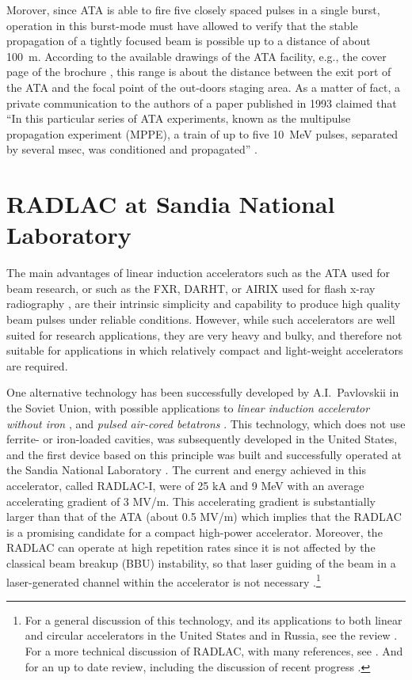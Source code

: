 \documentclass [12pt,a4paper,     ]{report} %
\begin{document}
   Morover, since ATA is able to fire five closely spaced pulses in a single burst, operation in this burst-mode must have allowed to verify that the stable propagation of a tightly focused beam is possible up to a distance of about 100~m.  According to the available drawings of the ATA facility, e.g., the cover page of the brochure \cite{LLNL1978-}, this range is about the distance between the exit port of the ATA and the focal point of the out-doors staging area.  As a matter of fact, a private communication to the authors of a paper published in 1993 claimed that ``In this particular series of ATA experiments, known as the multipulse propagation experiment (MPPE), a train of up to five 10~MeV pulses, separated by several msec, was conditioned and propagated'' \cite[p.4184]{HUBBA1993-}.



\section{RADLAC at Sandia National Laboratory}
\label{snl:0}


The main advantages of linear induction accelerators such as the ATA used for beam research, or such as the FXR, DARHT, or AIRIX used for flash x-ray radiography \cite{YU---1996-}, are their intrinsic simplicity and capability to produce high quality beam pulses under reliable conditions.  However, while such accelerators are well suited for research applications, they are very heavy and bulky, and therefore not suitable for applications in which relatively compact and light-weight accelerators are required.

One alternative technology has been successfully developed by A.I.\ Pavlovskii in the Soviet Union,  with possible applications to \emph{linear induction accelerator without iron} \cite{PAVLO1974-, PAVLO1980-}, and \emph{pulsed air-cored betatrons} \cite{PAVLO1976-,PAVLO1996-}.  This technology, which does not use ferrite- or iron-loaded cavities, was subsequently developed in the United States, and the first device based on this principle was built and successfully operated at the Sandia National Laboratory \cite{MILLE1981-}. The current and energy achieved in this accelerator, called RADLAC-I, were of 25 kA and 9 MeV with an average accelerating gradient of 3 MV/m.  This accelerating gradient is substantially larger than that of the ATA (about 0.5 MV/m) which implies that the RADLAC is a promising candidate for a compact high-power accelerator.  Moreover, the RADLAC can operate at high repetition rates since it is not affected by the classical beam breakup (BBU) instability, so that laser guiding of the beam in a laser-generated channel within the accelerator is not necessary \cite[p.1185]{MILLE1981-}.\footnote{For a general discussion of this technology, and its applications to both linear and circular accelerators in the United States and in Russia, see the review \cite{KAPET1985-}. For a more technical discussion of RADLAC, with many references, see \cite{PREST1986-}.  And for an up to date review, including the discussion of recent progress \cite{SMITH2004-}.}
\end{document}
